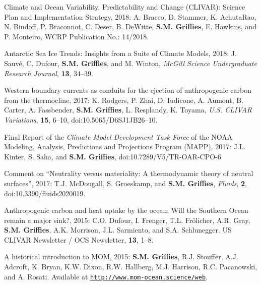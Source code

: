 \begin{etaremune}

\item Climate and Ocean Variability, Predictability and Change (CLIVAR): Science Plan and Implementation Strategy, 2018: 
A. Bracco, D. Stammer, K. AchutaRao, N. Bindoff, 
P. Braconnot, C. Deser, B. DeWitte, {\bf S.M. Grif\/f\/ies}, E. Hawkins, and P. Monteiro, WCRP Publication No.: 14/2018. 


\item Antarctic Sea Ice Trends: Insights from a Suite of Climate Models, 2018: 
J. Sauv\'{e}, C. Dufour, {\bf S.M. Grif\/f\/ies}, and M. Winton, {\it McGill Science Undergraduate Research Journal}, {\bf 13}, 34--39. 

\item Western boundary currents as conduits for the ejection of anthropogenic carbon from the thermocline, 2017: K. Rodgers, P. Zhai, D. Iudicone, A. Aumont, B. Carter, A. Fassbender, 
{\bf S.M. Grif\/f\/ies}, L. Resplandy, K. Toyama, {\it U.S. CLIVAR Variations}, {\bf 15}, 6--10, doi:10.5065/D6SJ1JB26--10.


\item Final Report of the {\it Climate Model Development Task Force}
  of the NOAA Modeling, Analysis, Predictions and Projections Program
  (MAPP), 2017: J.L. Kinter, S. Saha, and {\bf S.M. Grif\/fies}, doi:10.7289/V5/TR-OAR-CPO-6

\item Comment on ``Neutrality versus materiality: A thermodynamic
  theory of neutral surfaces'', 2017: T.J. McDougall, S. Groeskamp,
  and {\bf S.M. Grif\/fies}, {\it Fluids}, {\bf 2},
  doi:10.3390/fluids2020019.
 

\item Anthropogenic carbon and heat uptake by the ocean: Will the
  Southern Ocean remain a major sink?, 2015: C.O. Dufour, I. Frenger,
  T.L. Fr\"{o}licher, A.R. Gray, {\bf S.M. Grif\/f\/ies},
  A.K. Morrison, J.L. Sarmiento, and S.A. Schlunegger.  US CLIVAR
  Newsletter / OCS Newsletter, {\bf 13}, 1--8.

\item A historical introduction to MOM, 2015: {\bf S.M. Grif\/f\/ies},
  R.J. Stouffer, A.J. Adcroft, K. Bryan, K.W. Dixon, R.W. Hallberg,
  M.J. Harrison, R.C. Pacanowski, and A. Rosati.  Available at \href{\tt http://www.mom-ocean.science/web/docs/project/mom_history_v15.09.05.pdf}{\tt http://www.mom-ocean.science/web}.


\end{etaremune}
